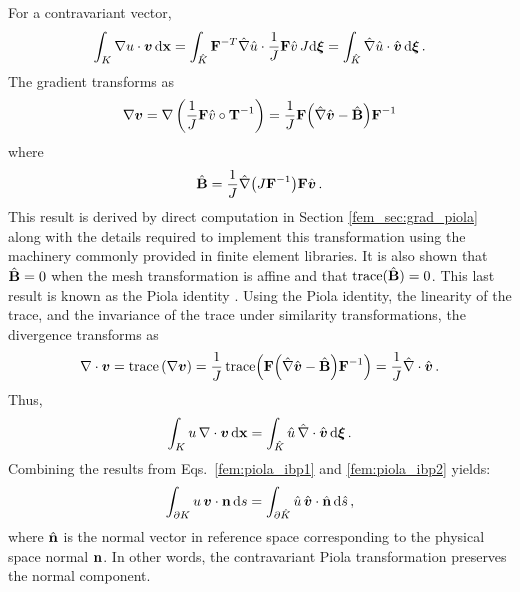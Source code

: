 \documentclass[../doc.tex]{subfiles}
\begin{document}
For a contravariant vector, 
	\begin{equation} \label{fem:piola_ibp1}
		\int_K \nabla u \cdot \boldsymbol{v} \mathop{}\!\mathrm{d} \boldsymbol{\mathrm{x}} = \int_{\hat{K}} \boldsymbol{\mathrm{F}}^{-T}\hat{\nabla} \hat{u} \cdot \frac{1}{J}\boldsymbol{\mathrm{F}} \hat{v}\, J\!\mathop{}\!\mathrm{d}\boldsymbol{\xi} = \int_{\hat{K}} \hat{\nabla} \hat{u} \cdot \hat{\boldsymbol{v}} \mathop{}\!\mathrm{d}\boldsymbol{\xi} \,. 
	\end{equation}
The gradient transforms as 
	\begin{equation} \label{fem:piola_grad}
		\nabla\boldsymbol{v} = \nabla\left( \frac{1}{J}\boldsymbol{\mathrm{F}}\hat{v}\circ\boldsymbol{\mathrm{T}}^{-1} \right) = \frac{1}{J}\boldsymbol{\mathrm{F}}\!\left( \hat{\nabla}\hat{\boldsymbol{v}} - \hat{\boldsymbol{\mathrm{B}}} \right)\!\boldsymbol{\mathrm{F}}^{-1} 
	\end{equation}
where 
	\begin{equation}
		\hat{\boldsymbol{\mathrm{B}}} = \frac{1}{J}\hat{\nabla}\!\left( J\boldsymbol{\mathrm{F}}^{-1} \right)\!\boldsymbol{\mathrm{F}}\hat{\boldsymbol{v}} \,. 
	\end{equation}
This result is derived by direct computation in Section \ref{fem_sec:grad_piola} along with the details required to implement this transformation using the machinery commonly provided in finite element libraries. It is also shown that $\hat{\boldsymbol{\mathrm{B}}} = 0$ when the mesh transformation is affine and that $\operatorname{trace}(\hat{\boldsymbol{\mathrm{B}}}) = 0$. This last result is known as the Piola identity \cite{ciarlet_elasticity}. Using the Piola identity, the linearity of the trace, and the invariance of the trace under similarity transformations, the divergence transforms as
	\begin{equation} \label{fem:piola_div}
		\nabla\cdot\boldsymbol{v} = \operatorname{trace}\left( \nabla\boldsymbol{v} \right) = \frac{1}{J}\operatorname{trace}\!\left( \boldsymbol{\mathrm{F}}\!\left( \hat{\nabla}\hat{\boldsymbol{v}} - \hat{\boldsymbol{\mathrm{B}}} \right)\!\boldsymbol{\mathrm{F}}^{-1} \right) = \frac{1}{J}\hat{\nabla}\cdot\hat{\boldsymbol{v}} \,. 
	\end{equation}
Thus, 
	\begin{equation} \label{fem:piola_ibp2}
		\int_K u\, \nabla\cdot\boldsymbol{v} \mathop{}\!\mathrm{d} \boldsymbol{\mathrm{x}} = \int_{\hat{K}} \hat{u}\, \hat{\nabla}\cdot\hat{\boldsymbol{v}} \mathop{}\!\mathrm{d}\boldsymbol{\xi} \,. 
	\end{equation}
Combining the results from Eqs.~\ref{fem:piola_ibp1} and \ref{fem:piola_ibp2} yields: 
	\begin{equation}
		\int_{\partial K} u\,\boldsymbol{v}\cdot\boldsymbol{\mathrm{n}} \mathop{}\!\mathrm{d} s = \int_{\partial\hat{K}} \hat{u}\, \hat{\boldsymbol{v}}\cdot\hat{\boldsymbol{\mathrm{n}}} \mathop{}\!\mathrm{d} \hat{s} \,, 
	\end{equation}
where $\hat{\boldsymbol{\mathrm{n}}}$ is the normal vector in reference space corresponding to the physical space normal $\boldsymbol{\mathrm{n}}$. 
In other words, the contravariant Piola transformation preserves the normal component. 
\end{document}
